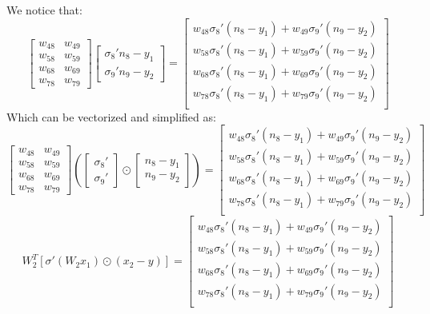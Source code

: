 \documentclass{article}
\begin{document}
We notice that:
\[
\begin{bmatrix}
    w_{48} & w_{49} \\
    w_{58} & w_{59} \\
    w_{68} & w_{69} \\
    w_{78} & w_{79}
\end{bmatrix}
\begin{bmatrix}
    \sigma_8'n_8-y_1 \\
    \sigma_9'n_9-y_2
\end{bmatrix}
=
\begin{bmatrix}
    w_{48}\sigma_8'(n_8-y_1) + w_{49}\sigma_9'(n_9-y_2) \\
    w_{58}\sigma_8'(n_8-y_1) + w_{59}\sigma_9'(n_9-y_2) \\
    w_{68}\sigma_8'(n_8-y_1) + w_{69}\sigma_9'(n_9-y_2) \\
    w_{78}\sigma_8'(n_8-y_1) + w_{79}\sigma_9'(n_9-y_2) \\
\end{bmatrix}
\]
Which can be vectorized and simplified as:
\[
\begin{bmatrix}
    w_{48} & w_{49} \\
    w_{58} & w_{59} \\
    w_{68} & w_{69} \\
    w_{78} & w_{79}
\end{bmatrix}
\left(
\begin{bmatrix}
    \sigma_8' \\
    \sigma_9'
\end{bmatrix}
\odot
\begin{bmatrix}
    n_8-y_1 \\
    n_9-y_2
\end{bmatrix}
\right)
=
\begin{bmatrix}
    w_{48}\sigma_8'(n_8-y_1) + w_{49}\sigma_9'(n_9-y_2) \\
    w_{58}\sigma_8'(n_8-y_1) + w_{59}\sigma_9'(n_9-y_2) \\
    w_{68}\sigma_8'(n_8-y_1) + w_{69}\sigma_9'(n_9-y_2) \\
    w_{78}\sigma_8'(n_8-y_1) + w_{79}\sigma_9'(n_9-y_2) \\
\end{bmatrix}
\]
\[
W_2^T[\sigma'(W_2x_1) \odot (x_2-y)] =
\begin{bmatrix}
    w_{48}\sigma_8'(n_8-y_1) + w_{49}\sigma_9'(n_9-y_2) \\
    w_{58}\sigma_8'(n_8-y_1) + w_{59}\sigma_9'(n_9-y_2) \\
    w_{68}\sigma_8'(n_8-y_1) + w_{69}\sigma_9'(n_9-y_2) \\
    w_{78}\sigma_8'(n_8-y_1) + w_{79}\sigma_9'(n_9-y_2) \\
\end{bmatrix}
\]
\end{document}
